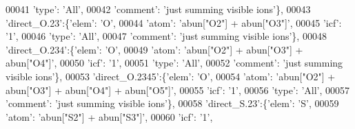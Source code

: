 \begin{DoxyCode}
00041                                        \textcolor{stringliteral}{'type'}: \textcolor{stringliteral}{'All'},
00042                                        \textcolor{stringliteral}{'comment'}: \textcolor{stringliteral}{'just summing visible ions'}\},
00043                          \textcolor{stringliteral}{'direct\_O.23'}:\{\textcolor{stringliteral}{'elem'}: \textcolor{stringliteral}{'O'},
00044                                        \textcolor{stringliteral}{'atom'}: \textcolor{stringliteral}{'abun["O2"] + abun["O3"]'},
00045                                        \textcolor{stringliteral}{'icf'}: \textcolor{stringliteral}{'1'},
00046                                        \textcolor{stringliteral}{'type'}: \textcolor{stringliteral}{'All'},
00047                                        \textcolor{stringliteral}{'comment'}: \textcolor{stringliteral}{'just summing visible ions'}\},
00048                          \textcolor{stringliteral}{'direct\_O.234'}:\{\textcolor{stringliteral}{'elem'}: \textcolor{stringliteral}{'O'},
00049                                        \textcolor{stringliteral}{'atom'}: \textcolor{stringliteral}{'abun["O2"] + abun["O3"] + abun["O4"]'},
00050                                        \textcolor{stringliteral}{'icf'}: \textcolor{stringliteral}{'1'},
00051                                        \textcolor{stringliteral}{'type'}: \textcolor{stringliteral}{'All'},
00052                                        \textcolor{stringliteral}{'comment'}: \textcolor{stringliteral}{'just summing visible ions'}\},
00053                          \textcolor{stringliteral}{'direct\_O.2345'}:\{\textcolor{stringliteral}{'elem'}: \textcolor{stringliteral}{'O'},
00054                                        \textcolor{stringliteral}{'atom'}: \textcolor{stringliteral}{'abun["O2"] + abun["O3"] + abun["O4"] + abun["O5"]'},
00055                                        \textcolor{stringliteral}{'icf'}: \textcolor{stringliteral}{'1'},
00056                                        \textcolor{stringliteral}{'type'}: \textcolor{stringliteral}{'All'},
00057                                        \textcolor{stringliteral}{'comment'}: \textcolor{stringliteral}{'just summing visible ions'}\},
00058                          \textcolor{stringliteral}{'direct\_S.23'}:\{\textcolor{stringliteral}{'elem'}: \textcolor{stringliteral}{'S'},
00059                                        \textcolor{stringliteral}{'atom'}: \textcolor{stringliteral}{'abun["S2"] + abun["S3"]'},
00060                                        \textcolor{stringliteral}{'icf'}: \textcolor{stringliteral}{'1'},

\end{DoxyCode}
